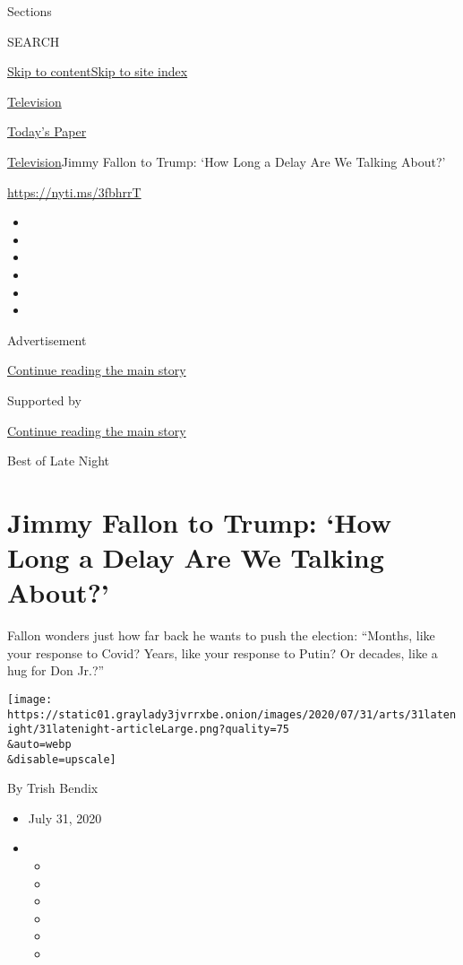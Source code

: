 Sections

SEARCH

\protect\hyperlink{site-content}{Skip to
content}\protect\hyperlink{site-index}{Skip to site index}

\href{https://www.nytimes3xbfgragh.onion/section/arts/television}{Television}

\href{https://myaccount.nytimes3xbfgragh.onion/auth/login?response_type=cookie\&client_id=vi}{}

\href{https://www.nytimes3xbfgragh.onion/section/todayspaper}{Today's
Paper}

\href{/section/arts/television}{Television}\textbar{}Jimmy Fallon to
Trump: `How Long a Delay Are We Talking About?'

\url{https://nyti.ms/3fbhrrT}

\begin{itemize}
\item
\item
\item
\item
\item
\item
\end{itemize}

Advertisement

\protect\hyperlink{after-top}{Continue reading the main story}

Supported by

\protect\hyperlink{after-sponsor}{Continue reading the main story}

Best of Late Night

\hypertarget{jimmy-fallon-to-trump-how-long-a-delay-are-we-talking-about}{%
\section{Jimmy Fallon to Trump: `How Long a Delay Are We Talking
About?'}\label{jimmy-fallon-to-trump-how-long-a-delay-are-we-talking-about}}

Fallon wonders just how far back he wants to push the election:
``Months, like your response to Covid? Years, like your response to
Putin? Or decades, like a hug for Don Jr.?''

\texttt{[image: https://static01.graylady3jvrrxbe.onion/images/2020/07/31/arts/31latenight/31latenight-articleLarge.png?quality=75\\\&auto=webp\\\&disable=upscale]}

By Trish Bendix

\begin{itemize}
\item
  July 31, 2020
\item
  \begin{itemize}
  \item
  \item
  \item
  \item
  \item
  \item
  \end{itemize}
\end{itemize}

